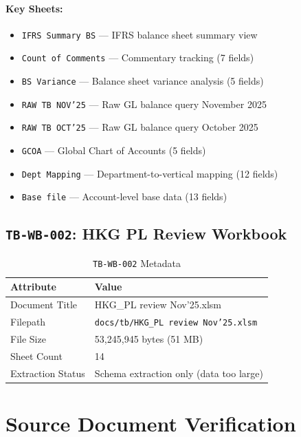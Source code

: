 \documentclass[11pt,a4paper,twoside]{report}
\newcommand{\srcref}[1]{\texttt{#1}}
\begin{document}
\paragraph{Key Sheets:}
\begin{itemize}[noitemsep]
\item \texttt{IFRS Summary BS} --- IFRS balance sheet summary view
\item \texttt{Count of Comments} --- Commentary tracking (7 fields)
\item \texttt{BS Variance} --- Balance sheet variance analysis (5 fields)
\item \texttt{RAW TB NOV'25} --- Raw GL balance query November 2025
\item \texttt{RAW TB OCT'25} --- Raw GL balance query October 2025
\item \texttt{GCOA} --- Global Chart of Accounts (5 fields)
\item \texttt{Dept Mapping} --- Department-to-vertical mapping (12 fields)
\item \texttt{Base file} --- Account-level base data (13 fields)
\end{itemize}

\subsection{\srcref{TB-WB-002}: HKG PL Review Workbook}
\label{sec:tb-wb-002}

\begin{table}[h]
\centering
\caption{\srcref{TB-WB-002} Metadata}
\begin{tabularx}{\textwidth}{@{}L{4cm}L{10cm}@{}}
\toprule
\textbf{Attribute} & \textbf{Value} \\
\midrule
Document Title & HKG\_PL review Nov'25.xlsm \\
Filepath & \texttt{docs/tb/HKG\_PL review Nov'25.xlsm} \\
File Size & 53,245,945 bytes (51 MB) \\
Sheet Count & 14 \\
Extraction Status & Schema extraction only (data too large) \\
\bottomrule
\end{tabularx}
\end{table}

\section{Source Document Verification}
\label{sec:source-verification}
\end{document}
